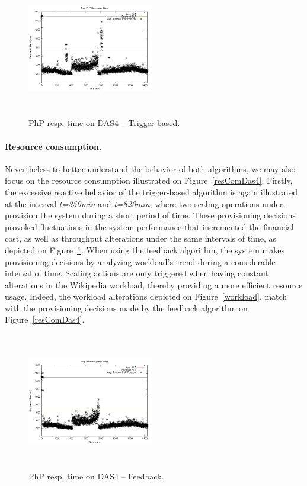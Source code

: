 \begin{figure}

\begin{center}
\includegraphics[width=0.49\textwidth, height=6cm]{./images/homogeneous/avgTimeout_PhP_naive}
\end{center}
\caption{PhP resp. time on DAS4 -- Trigger-based.}
\label{naiveDas4}
\end{figure}

\paragraph{Resource consumption.}

Nevertheless to better understand the behavior of both algorithms, we may also focus on the resource consumption illustrated on Figure~\ref{resComDas4}. Firstly, the excessive reactive behavior of the trigger-based algorithm is again illustrated at the interval \emph{t=350min} and \emph{t=820min}, where two scaling operations under-provision the system during a short period of time. These provisioning decisions provoked fluctuations in the system performance that incremented the financial cost, as well as throughput alterations under the same intervals of time, as depicted on Figure~\ref{naiveDas4}. When using the feedback algorithm, the system makes provisioning decisions by analyzing workload's trend during a considerable interval of time. Scaling actions are only triggered when having constant alterations in the Wikipedia workload, thereby providing a more efficient resource usage. Indeed, the workload alterations depicted on Figure~\ref{workload}, match with the provisioning decisions made by the feedback algorithm on Figure~\ref{resComDas4}.

\begin{figure}
\begin{center}
\includegraphics[width=0.49\textwidth, height=6cm]{./images/homogeneous/avgTimeout_PhP_history}
\end{center}
\caption{PhP resp. time on DAS4 -- Feedback.}
\label{historyDas4}
\end{figure}

